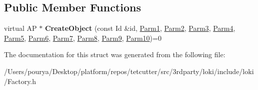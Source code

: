 \subsection*{Public Member Functions}
\begin{DoxyCompactItemize}
\item 
\hypertarget{structLoki_1_1FactoryImpl_3_01AP_00_01Id_00_01LOKI__TYPELIST__10_07P1_00_01P2_00_01P3_00_01P4_006bf86c8d65ea04f4e008765340803443_a11e2459ce0239a2e1b35f19b0593dbba}{}virtual A\+P $\ast$ {\bfseries Create\+Object} (const Id \&id, \hyperlink{classLoki_1_1EmptyType}{Parm1}, \hyperlink{classLoki_1_1EmptyType}{Parm2}, \hyperlink{classLoki_1_1EmptyType}{Parm3}, \hyperlink{classLoki_1_1EmptyType}{Parm4}, \hyperlink{classLoki_1_1EmptyType}{Parm5}, \hyperlink{classLoki_1_1EmptyType}{Parm6}, \hyperlink{classLoki_1_1EmptyType}{Parm7}, \hyperlink{classLoki_1_1EmptyType}{Parm8}, \hyperlink{classLoki_1_1EmptyType}{Parm9}, \hyperlink{classLoki_1_1EmptyType}{Parm10})=0\label{structLoki_1_1FactoryImpl_3_01AP_00_01Id_00_01LOKI__TYPELIST__10_07P1_00_01P2_00_01P3_00_01P4_006bf86c8d65ea04f4e008765340803443_a11e2459ce0239a2e1b35f19b0593dbba}

\end{DoxyCompactItemize}


The documentation for this struct was generated from the following file\+:\begin{DoxyCompactItemize}
\item 
/\+Users/pourya/\+Desktop/platform/repos/tetcutter/src/3rdparty/loki/include/loki/Factory.\+h\end{DoxyCompactItemize}
